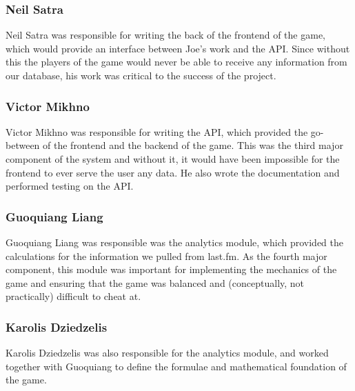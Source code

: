 \documentclass[a4paper,10pt,twoside]{article}
\begin{document}
\subsubsection{Neil Satra}
Neil Satra was responsible for writing the back of the frontend of the game, which would provide an interface between Joe's work and the API. Since without this the players of the game would never be able to receive any information from our database, his work was critical to the success of the project.
\subsubsection{Victor Mikhno}
Victor Mikhno was responsible for writing the API, which provided the go-between of the frontend and the backend of the game. This was the third major component of the system and without it, it would have been impossible for the frontend to ever serve the user any data. He also wrote the documentation and performed testing on the API.
\subsubsection{Guoquiang Liang}
Guoquiang Liang was responsible was the analytics module, which provided the calculations for the information we pulled from last.fm. As the fourth major component, this module was important for implementing the mechanics of the game and ensuring that the game was balanced and (conceptually, not practically) difficult to cheat at.
\subsubsection{Karolis Dziedzelis}
Karolis Dziedzelis was also responsible for the analytics module, and worked together with Guoquiang to define the formulae and mathematical foundation of the game. 
\end{document}

